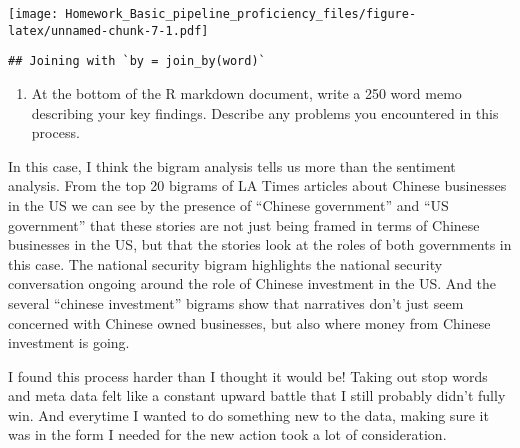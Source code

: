 \documentclass[
]{article}
\newenvironment{Shaded}{\begin{snugshade}}{\end{snugshade}}
\newcommand{\AttributeTok}[1]{\textcolor[rgb]{0.13,0.29,0.53}{#1}}
\newcommand{\CommentTok}[1]{\textcolor[rgb]{0.56,0.35,0.01}{\textit{#1}}}
\newcommand{\ConstantTok}[1]{\textcolor[rgb]{0.56,0.35,0.01}{#1}}
\newcommand{\FunctionTok}[1]{\textcolor[rgb]{0.13,0.29,0.53}{\textbf{#1}}}
\newcommand{\NormalTok}[1]{#1}
\newcommand{\OtherTok}[1]{\textcolor[rgb]{0.56,0.35,0.01}{#1}}
\newcommand{\SpecialCharTok}[1]{\textcolor[rgb]{0.81,0.36,0.00}{\textbf{#1}}}
\newcommand{\StringTok}[1]{\textcolor[rgb]{0.31,0.60,0.02}{#1}}
\providecommand{\tightlist}{%
  \setlength{\itemsep}{0pt}\setlength{\parskip}{0pt}}
\begin{document}
\texttt{[image: Homework\_Basic\_pipeline\_proficiency\_files/figure-latex/unnamed-chunk-7-1.pdf]}

\begin{Shaded}
\end{Shaded}

\begin{verbatim}
## Joining with `by = join_by(word)`
\end{verbatim}

\begin{enumerate}
\def\labelenumi{\arabic{enumi}.}
\setcounter{enumi}{8}
\tightlist
\item
  At the bottom of the R markdown document, write a 250 word memo
  describing your key findings. Describe any problems you encountered in
  this process.
\end{enumerate}

In this case, I think the bigram analysis tells us more than the
sentiment analysis. From the top 20 bigrams of LA Times articles about
Chinese businesses in the US we can see by the presence of ``Chinese
government'' and ``US government'' that these stories are not just being
framed in terms of Chinese businesses in the US, but that the stories
look at the roles of both governments in this case. The national
security bigram highlights the national security conversation ongoing
around the role of Chinese investment in the US. And the several
``chinese investment'' bigrams show that narratives don't just seem
concerned with Chinese owned businesses, but also where money from
Chinese investment is going.

I found this process harder than I thought it would be! Taking out stop
words and meta data felt like a constant upward battle that I still
probably didn't fully win. And everytime I wanted to do something new to
the data, making sure it was in the form I needed for the new action
took a lot of consideration.
\end{document}
